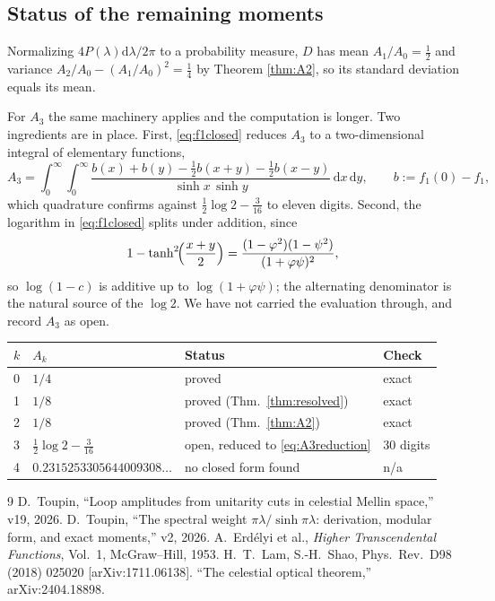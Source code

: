 \documentclass[12pt,a4paper]{article}
\theoremstyle{plain}
\theoremstyle{definition}
\theoremstyle{remark}
\newcommand{\dd}{\mathrm{d}}
\begin{document}
\subsection{Status of the remaining moments}

Normalizing $4P(\lambda)\dd\lambda/2\pi$ to a probability measure, $D$
has mean $A_1/A_0=\tfrac12$ and variance
$A_2/A_0-(A_1/A_0)^2=\tfrac14$ by Theorem \ref{thm:A2}, so its standard
deviation equals its mean.

For $A_3$ the same machinery applies and the computation is longer. Two
ingredients are in place. First, \eqref{eq:f1closed} reduces $A_3$ to a
two-dimensional integral of elementary functions,
\begin{equation}
A_3=\int_0^\infty\!\!\int_0^\infty
\frac{b(x)+b(y)-\tfrac12 b(x+y)-\tfrac12 b(x-y)}{\sinh x\,\sinh y}\,\dd x\,\dd y,
\qquad b:=f_1(0)-f_1 ,
\label{eq:A3reduction}
\end{equation}
which quadrature confirms against
$\tfrac12\log2-\tfrac{3}{16}$ to eleven digits. Second, the logarithm in
\eqref{eq:f1closed} splits under addition, since
\begin{equation}
1-\tanh^2\!\Bigl(\frac{x+y}{2}\Bigr)
=\frac{(1-\varphi^2)(1-\psi^2)}{(1+\varphi\psi)^2},
\end{equation}
so $\log(1-c)$ is additive up to $\log(1+\varphi\psi)$; the alternating
denominator is the natural source of the $\log 2$. We have not carried
the evaluation through, and record $A_3$ as open.

\begin{center}
\begin{tabular}{llll}
\toprule
$k$ & $A_k$ & Status & Check \\
\midrule
0 & $1/4$ & proved & exact \\
1 & $1/8$ & proved (Thm.~\ref{thm:resolved}) & exact \\
2 & $1/8$ & proved (Thm.~\ref{thm:A2}) & exact \\
3 & $\tfrac12\log 2-\tfrac{3}{16}$ & open, reduced to \eqref{eq:A3reduction} & 30 digits \\
4 & $0.2315253305644009308\ldots$ & no closed form found & n/a \\
\bottomrule
\end{tabular}
\end{center}

\begin{thebibliography}{9}
 D.~Toupin, ``Loop amplitudes from unitarity cuts
in celestial Mellin space,'' v19, 2026.
 D.~Toupin, ``The spectral weight
$\pi\lambda/\sinh\pi\lambda$: derivation, modular form, and exact
moments,'' v2, 2026.
 A.~Erd\'elyi et al., \textit{Higher Transcendental
Functions}, Vol.~1, McGraw--Hill, 1953.
 H.~T.~Lam, S.-H.~Shao, Phys.\ Rev.\ D98 (2018)
025020 [arXiv:1711.06138].
 ``The celestial optical theorem,''
arXiv:2404.18898.
\end{thebibliography}
\end{document}
